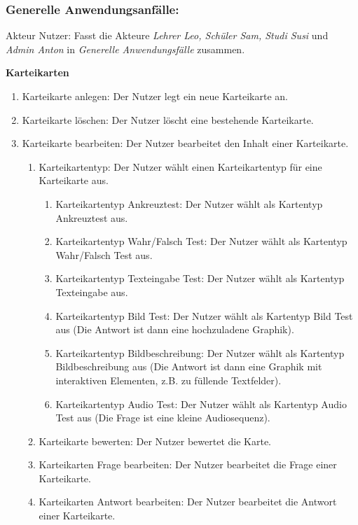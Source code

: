 \documentclass[fontsize=12pt,paper=a4,twoside]{scrartcl}
\begin{document}
\subsubsection{Generelle Anwendungsanfälle:}
 Akteur Nutzer: Fasst die Akteure \textit{Lehrer Leo, Schüler Sam, Studi Susi} und \textit{Admin Anton} in \textit{Generelle Anwendungsfälle} zusammen.

\textbf{Karteikarten}
\begin{enumerate}[label={N\arabic*}]
	\item Karteikarte anlegen: Der Nutzer legt ein neue Karteikarte an.
	\item Karteikarte löschen: Der Nutzer löscht eine bestehende Karteikarte.
	\label{N2}
	\item Karteikarte bearbeiten: Der Nutzer bearbeitet den Inhalt einer Karteikarte.
	\label{N3}
	\begin{enumerate}[label*={-\arabic*}]
		\item Karteikartentyp: Der Nutzer wählt einen Karteikartentyp für eine Karteikarte aus.
		\begin{enumerate}[label*={-\arabic*}]
			\item Karteikartentyp Ankreuztest: Der Nutzer wählt als Kartentyp Ankreuztest aus.
			\item Karteikartentyp Wahr/Falsch Test: Der Nutzer wählt als Kartentyp Wahr/Falsch Test aus.
			\item Karteikartentyp Texteingabe Test: Der Nutzer wählt als Kartentyp Texteingabe aus.
			\item Karteikartentyp Bild Test: Der Nutzer wählt als Kartentyp Bild Test aus (Die Antwort ist dann eine hochzuladene Graphik).
			\item Karteikartentyp Bildbeschreibung: Der Nutzer wählt als Kartentyp Bildbeschreibung aus (Die Antwort ist dann eine Graphik mit interaktiven Elementen, z.B. zu füllende Textfelder).
			\item Karteikartentyp Audio Test: Der Nutzer wählt als Kartentyp Audio Test aus (Die Frage ist eine kleine Audiosequenz).
		\end{enumerate}
		\item Karteikarte bewerten: Der Nutzer bewertet die Karte.
		\item Karteikarten Frage bearbeiten: Der Nutzer bearbeitet die Frage einer Karteikarte.
		\item Karteikarten Antwort bearbeiten: Der Nutzer bearbeitet die Antwort einer Karteikarte.

\end{enumerate}
\end{enumerate}
\end{document}
